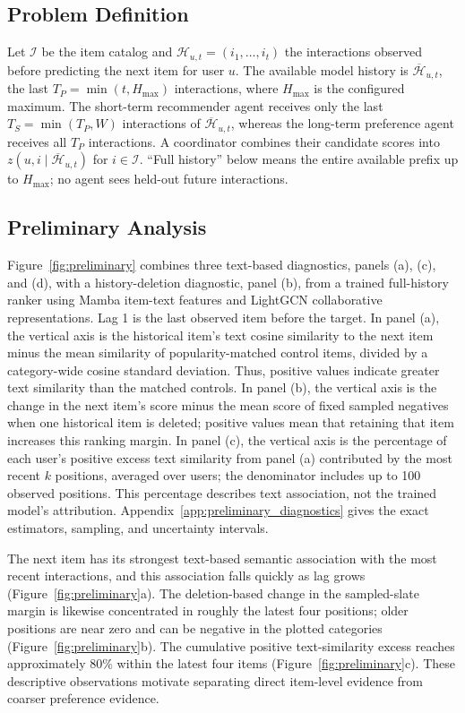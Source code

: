 \documentclass[11pt]{article}
\begin{document}
\subsection{Problem Definition}
Let $\mathcal I$ be the item catalog and $\mathcal H_{u,t}=(i_1,\ldots,i_t)$ the interactions observed before predicting the next item for user $u$. The available model history is $\overline{\mathcal H}_{u,t}$, the last $T_P=\min(t,H_{\max})$ interactions, where $H_{\max}$ is the configured maximum. The short-term recommender agent receives only the last $T_S=\min(T_P,W)$ interactions of $\overline{\mathcal H}_{u,t}$, whereas the long-term preference agent receives all $T_P$ interactions. A coordinator combines their candidate scores into $z(u,i\mid\overline{\mathcal H}_{u,t})$ for $i\in\mathcal I$. ``Full history'' below means the entire available prefix up to $H_{\max}$; no agent sees held-out future interactions.

\subsection{Preliminary Analysis}
\label{sec:preliminary}

Figure~\ref{fig:preliminary} combines three text-based diagnostics, panels (a), (c), and (d), with a history-deletion diagnostic, panel (b), from a trained full-history ranker using Mamba item-text features and LightGCN collaborative representations. Lag 1 is the last observed item before the target. In panel (a), the vertical axis is the historical item's text cosine similarity to the next item minus the mean similarity of popularity-matched control items, divided by a category-wide cosine standard deviation. Thus, positive values indicate greater text similarity than the matched controls. In panel (b), the vertical axis is the change in the next item's score minus the mean score of fixed sampled negatives when one historical item is deleted; positive values mean that retaining that item increases this ranking margin. In panel (c), the vertical axis is the percentage of each user's positive excess text similarity from panel (a) contributed by the most recent $k$ positions, averaged over users; the denominator includes up to 100 observed positions. This percentage describes text association, not the trained model's attribution. Appendix~\ref{app:preliminary_diagnostics} gives the exact estimators, sampling, and uncertainty intervals.

The next item has its strongest text-based semantic association with the most recent interactions, and this association falls quickly as lag grows (Figure~\ref{fig:preliminary}a). The deletion-based change in the sampled-slate margin is likewise concentrated in roughly the latest four positions; older positions are near zero and can be negative in the plotted categories (Figure~\ref{fig:preliminary}b). The cumulative positive text-similarity excess reaches approximately 80\% within the latest four items (Figure~\ref{fig:preliminary}c). These descriptive observations motivate separating direct item-level evidence from coarser preference evidence.
\end{document}
